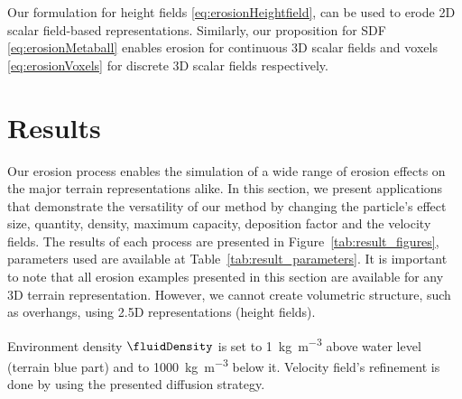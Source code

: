 Our formulation for height fields \eqref{eq:erosionHeightfield}, can be used to erode 2D scalar field-based representations. Similarly, 
our proposition for SDF \eqref{eq:erosionMetaball} enables erosion for continuous 3D scalar fields and voxels \eqref{eq:erosionVoxels} for discrete 3D scalar fields respectively.
\section{Results}
\label{sec:erosion_erosion_examples}
Our erosion process enables the simulation of a wide range of erosion effects on the major terrain representations alike. In this section, we present applications that demonstrate the versatility of our method by changing the particle's effect size, quantity, density, maximum capacity, deposition factor and the velocity fields. The results of each process are presented in Figure~\ref{tab:result_figures}, parameters used are available at Table~\ref{tab:result_parameters}. 
It is important to note that all erosion examples presented in this section are available for any 3D terrain representation. However, we cannot create volumetric structure, such as overhangs, using 2.5D representations (height fields).

Environment density $\fluidDensity$ is set to \SI{1}{\kilogram\per\cubic\meter} above water level (terrain blue part) and to \SI{1000}{\kilogram\per\cubic\meter} below it.
Velocity field's refinement is done by using the presented diffusion strategy.

